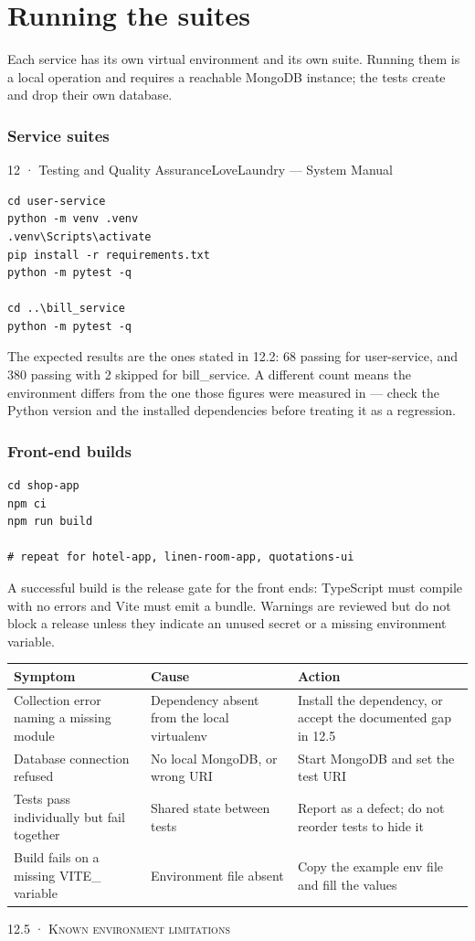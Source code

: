 \documentclass[11pt,a4paper,oneside]{book}
\begin{document}
\section*{Running the suites}
Each service has its own virtual environment and its own suite. Running them is a local operation and requires a reachable MongoDB instance; the tests create and drop their own database.

\subsubsection*{Service suites}
12 · Testing and Quality AssuranceLoveLaundry — System Manual

\begin{verbatim}
cd user-service
python -m venv .venv
.venv\Scripts\activate
pip install -r requirements.txt
python -m pytest -q

cd ..\bill_service
python -m pytest -q
\end{verbatim}
The expected results are the ones stated in 12.2: 68 passing for user-service, and 380 passing with 2 skipped for bill\_service. A different count means the environment differs from the one those figures were measured in — check the Python version and the installed dependencies before treating it as a regression.

\subsubsection*{Front-end builds}
\begin{verbatim}
cd shop-app
npm ci
npm run build

# repeat for hotel-app, linen-room-app, quotations-ui
\end{verbatim}
A successful build is the release gate for the front ends: TypeScript must compile with no errors and Vite must emit a bundle. Warnings are reviewed but do not block a release unless they indicate an unused secret or a missing environment variable.

\begin{center}\small
\begin{tabularx}{\linewidth}{|X|X|X|}
\hline
\rowcolor{lightgrey}
\textbf{Symptom} & \textbf{Cause} & \textbf{Action} \\ \hline
Collection error naming a missing module & Dependency absent from the local virtualenv & Install the dependency, or accept the documented gap in 12.5 \\ \hline
Database connection refused & No local MongoDB, or wrong URI & Start MongoDB and set the test URI \\ \hline
Tests pass individually but fail together & Shared state between tests & Report as a defect; do not reorder tests to hide it \\ \hline
Build fails on a missing VITE\_ variable & Environment file absent & Copy the example env file and fill the values \\ \hline
\end{tabularx}
\end{center}
\textsc{\small\color{crimson}12.5 · Known environment limitations}\par\medskip
\end{document}
